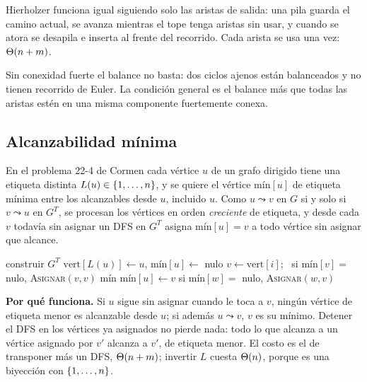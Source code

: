 \documentclass[11pt,letterpaper]{article}
\begin{document}
Hierholzer funciona igual siguiendo solo las aristas de salida: una
pila guarda el camino actual, se avanza mientras el tope tenga aristas
sin usar, y cuando se atora se desapila e inserta al frente del
recorrido. Cada arista se usa una vez: $\Theta\!\left(n + m\right)$.

\begin{ojo}
  Sin conexidad fuerte el balance no basta: dos ciclos ajenos están
  balanceados y no tienen recorrido de Euler. La condición general es
  el balance más que todas las aristas estén en una misma componente
  fuertemente conexa.
\end{ojo}


\subsection*{Alcanzabilidad mínima}

En el problema 22-4 de Cormen cada vértice $u$ de un grafo dirigido
tiene una etiqueta distinta $L(u) \in \left\{ 1, \dots, n \right\}$, y se quiere
el vértice $\text{mín}[u]$ de etiqueta mínima entre los alcanzables
desde $u$, incluido $u$. Como $u \leadsto v$ en $G$ si y solo si
$v \leadsto u$ en $G^T$, se procesan los vértices en orden
\emph{creciente} de etiqueta, y desde cada $v$ todavía sin asignar un
DFS en $G^T$ asigna $\text{mín}[u] = v$ a todo vértice sin asignar que
alcance.

\begin{algorithm}[H]
\caption{\textsc{Mínimos-Alcanzables}$(G, L)$, problema 22-4}
\label{alg:minimos-alcanzables}
\begin{algorithmic}[1]
  \State construir $G^T$
    \State $\text{vert}[L(u)] \gets u$, \quad
           $\text{mín}[u] \gets$ nulo
  \EndFor
    \State $v \gets \text{vert}[i]$; \ si $\text{mín}[v] =$ nulo,
           \textsc{Asignar}$(v, v)$
  \EndFor
  \State \Return $\text{mín}$
\EndProcedure
\Statex
{} 
  \State $\text{mín}[u] \gets v$
    \State si $\text{mín}[w] =$ nulo, \textsc{Asignar}$(w, v)$
  \EndFor
\EndProcedure
\end{algorithmic}
\end{algorithm}

\textbf{Por qué funciona.} Si $u$ sigue sin asignar cuando le toca a
$v$, ningún vértice de etiqueta menor es alcanzable desde $u$; si
además $u \leadsto v$, $v$ es su mínimo. Detener el DFS en los
vértices ya asignados no pierde nada: todo lo que alcanza a un vértice
asignado por $v'$ alcanza a $v'$, de etiqueta menor. El costo es el de
transponer más un DFS, $\Theta\!\left(n + m\right)$; invertir $L$ cuesta $\Theta\!\left(n\right)$,
porque es una biyección con $\left\{ 1, \dots, n \right\}$.
\end{document}
